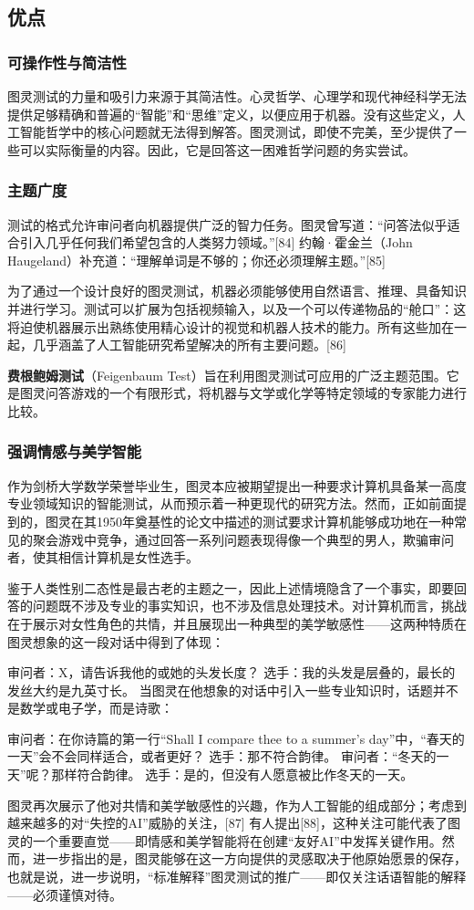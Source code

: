 \subsection{优点}
\subsubsection{可操作性与简洁性}  
图灵测试的力量和吸引力来源于其简洁性。心灵哲学、心理学和现代神经科学无法提供足够精确和普遍的“智能”和“思维”定义，以便应用于机器。没有这些定义，人工智能哲学中的核心问题就无法得到解答。图灵测试，即使不完美，至少提供了一些可以实际衡量的内容。因此，它是回答这一困难哲学问题的务实尝试。
\subsubsection{主题广度}  
测试的格式允许审问者向机器提供广泛的智力任务。图灵曾写道：“问答法似乎适合引入几乎任何我们希望包含的人类努力领域。”[84] 约翰·霍金兰（John Haugeland）补充道：“理解单词是不够的；你还必须理解主题。”[85]

为了通过一个设计良好的图灵测试，机器必须能够使用自然语言、推理、具备知识并进行学习。测试可以扩展为包括视频输入，以及一个可以传递物品的“舱口”：这将迫使机器展示出熟练使用精心设计的视觉和机器人技术的能力。所有这些加在一起，几乎涵盖了人工智能研究希望解决的所有主要问题。[86]

\textbf{费根鲍姆测试}（Feigenbaum Test）旨在利用图灵测试可应用的广泛主题范围。它是图灵问答游戏的一个有限形式，将机器与文学或化学等特定领域的专家能力进行比较。
\subsubsection{强调情感与美学智能} 
作为剑桥大学数学荣誉毕业生，图灵本应被期望提出一种要求计算机具备某一高度专业领域知识的智能测试，从而预示着一种更现代的研究方法。然而，正如前面提到的，图灵在其1950年奠基性的论文中描述的测试要求计算机能够成功地在一种常见的聚会游戏中竞争，通过回答一系列问题表现得像一个典型的男人，欺骗审问者，使其相信计算机是女性选手。

鉴于人类性别二态性是最古老的主题之一，因此上述情境隐含了一个事实，即要回答的问题既不涉及专业的事实知识，也不涉及信息处理技术。对计算机而言，挑战在于展示对女性角色的共情，并且展现出一种典型的美学敏感性——这两种特质在图灵想象的这一段对话中得到了体现：

审问者：X，请告诉我他的或她的头发长度？  
选手：我的头发是层叠的，最长的发丝大约是九英寸长。  
当图灵在他想象的对话中引入一些专业知识时，话题并不是数学或电子学，而是诗歌：

审问者：在你诗篇的第一行“Shall I compare thee to a summer's day”中，“春天的一天”会不会同样适合，或者更好？  
选手：那不符合韵律。  
审问者：“冬天的一天”呢？那样符合韵律。  
选手：是的，但没有人愿意被比作冬天的一天。  

图灵再次展示了他对共情和美学敏感性的兴趣，作为人工智能的组成部分；考虑到越来越多的对“失控的AI”威胁的关注，[87] 有人提出[88]，这种关注可能代表了图灵的一个重要直觉——即情感和美学智能将在创建“友好AI”中发挥关键作用。然而，进一步指出的是，图灵能够在这一方向提供的灵感取决于他原始愿景的保存，也就是说，进一步说明，“标准解释”图灵测试的推广——即仅关注话语智能的解释——必须谨慎对待。